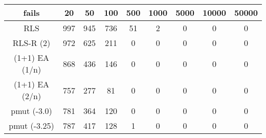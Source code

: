 \begin{tabular}[h]{ccccccccc}
fails&20&50&100&500&1000&5000&10000&50000\\\hline
RLS&997&945&736&51&2&0&0&0\\
RLS-R (2)&972&625&211&0&0&0&0&0\\
(1+1) EA (1/n)&868&436&146&0&0&0&0&0\\
(1+1) EA (2/n)&757&277&81&0&0&0&0&0\\
pmut (-3.0)&781&364&120&0&0&0&0&0\\
pmut (-3.25)&787&417&128&1&0&0&0&0\\
\end{tabular}
